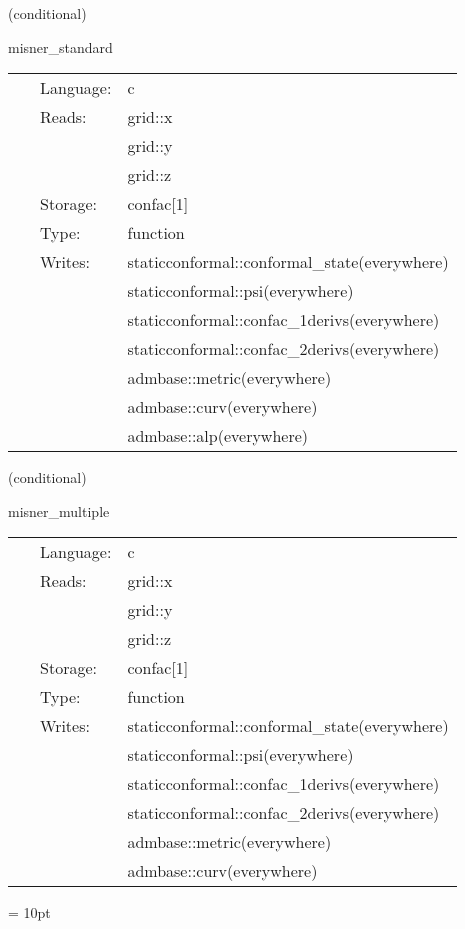 \documentclass{article}
\begin{document}
\vspace{5mm}

   (conditional) 

\hspace{5mm} misner\_standard 

\hspace{5mm}{\it construct initial data for two misner black holes } 


\hspace{5mm}

 \begin{tabular*}{160mm}{cll} 
~ & Language:  & c \\ 
~ & Reads:  & grid::x \\ 
~& ~ &grid::y\\ 
~& ~ &grid::z\\ 
~ & Storage:  & confac[1] \\ 
~ & Type:  & function \\ 
~ & Writes:  & staticconformal::conformal\_state(everywhere) \\ 
~& ~ &staticconformal::psi(everywhere)\\ 
~& ~ &staticconformal::confac\_1derivs(everywhere)\\ 
~& ~ &staticconformal::confac\_2derivs(everywhere)\\ 
~& ~ &admbase::metric(everywhere)\\ 
~& ~ &admbase::curv(everywhere)\\ 
~& ~ &admbase::alp(everywhere)\\ 
\end{tabular*} 


\vspace{5mm}

   (conditional) 

\hspace{5mm} misner\_multiple 

\hspace{5mm}{\it construct initial data for multiple misner black holes } 


\hspace{5mm}

 \begin{tabular*}{160mm}{cll} 
~ & Language:  & c \\ 
~ & Reads:  & grid::x \\ 
~& ~ &grid::y\\ 
~& ~ &grid::z\\ 
~ & Storage:  & confac[1] \\ 
~ & Type:  & function \\ 
~ & Writes:  & staticconformal::conformal\_state(everywhere) \\ 
~& ~ &staticconformal::psi(everywhere)\\ 
~& ~ &staticconformal::confac\_1derivs(everywhere)\\ 
~& ~ &staticconformal::confac\_2derivs(everywhere)\\ 
~& ~ &admbase::metric(everywhere)\\ 
~& ~ &admbase::curv(everywhere)\\ 
\end{tabular*} 



\vspace{5mm}\parskip = 10pt 
\end{document}
